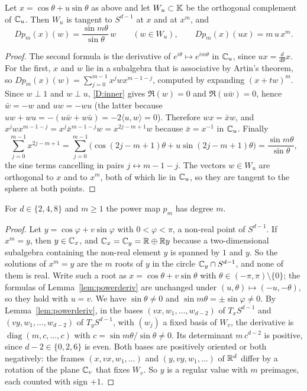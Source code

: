 \begin{lemma}\label{lem:powerderiv}
Let $x=\cos\theta+u\sin\theta$ as above and let $W_u\subset\mathbb{K}$ be the orthogonal complement of $\mathbb{C}_u$. Then $W_u$ is tangent to $S^{d-1}$ at $x$ and at $x^m$, and
\[
Dp_m(x)(w)=\frac{\sin m\theta}{\sin\theta}\,w\qquad(w\in W_u),\qquad Dp_m(x)(ux)=m\,u\,x^m .
\]
\end{lemma}

\begin{proof}
The second formula is the derivative of $e^{i\theta}\mapsto e^{im\theta}$ in $\mathbb{C}_u$, since $ux=\frac{d}{d\theta}x$. For the first, $x$ and $w$ lie in a subalgebra that is associative by Artin's theorem, so $Dp_m(x)(w)=\sum_{j=0}^{m-1}x^jwx^{m-1-j}$, computed by expanding $(x+tw)^m$. Since $w\perp1$ and $w\perp u$, \ref{D:inner} gives $\Re(w)=0$ and $\Re(u\bar w)=0$, hence $\bar w=-w$ and $uw=-wu$ (the latter because $uw+wu=-(u\bar w+w\bar u)=-2\langle u,w\rangle=0$). Therefore $wx=\bar xw$, and $x^jwx^{m-1-j}=x^j\bar x^{m-1-j}w=x^{2j-m+1}w$ because $\bar x=x^{-1}$ in $\mathbb{C}_u$. Finally
\[
\sum_{j=0}^{m-1}x^{2j-m+1}=\sum_{j=0}^{m-1}\bigl(\cos(2j-m+1)\theta+u\sin(2j-m+1)\theta\bigr)=\frac{\sin m\theta}{\sin\theta},
\]
the sine terms cancelling in pairs $j\leftrightarrow m-1-j$. The vectors $w\in W_u$ are orthogonal to $x$ and to $x^m$, both of which lie in $\mathbb{C}_u$, so they are tangent to the sphere at both points.
\end{proof}

\begin{proposition}\label{prop:powerdegree}
For $d\in\{2,4,8\}$ and $m\ge1$ the power map $p_m$ has degree $m$.
\end{proposition}

\begin{proof}
Let $y=\cos\varphi+v\sin\varphi$ with $0<\varphi<\pi$, a non-real point of $S^{d-1}$. If $x^m=y$, then $y\in\mathbb{C}_x$, and $\mathbb{C}_x=\mathbb{C}_y=\mathbb{R}\oplus\mathbb{R} y$ because a two-dimensional subalgebra containing the non-real element $y$ is spanned by $1$ and $y$. So the solutions of $x^m=y$ are the $m$ roots of $y$ in the circle $\mathbb{C}_y\cap S^{d-1}$, and none of them is real. Write such a root as $x=\cos\theta+v\sin\theta$ with $\theta\in(-\pi,\pi)\setminus\{0\}$; the formulas of Lemma~\ref{lem:powerderiv} are unchanged under $(u,\theta)\mapsto(-u,-\theta)$, so they hold with $u=v$. We have $\sin\theta\ne0$ and $\sin m\theta=\pm\sin\varphi\ne0$. By Lemma~\ref{lem:powerderiv}, in the bases $(vx,w_1,\dots,w_{d-2})$ of $T_xS^{d-1}$ and $(vy,w_1,\dots,w_{d-2})$ of $T_yS^{d-1}$, with $(w_j)$ a fixed basis of $W_v$, the derivative is $\operatorname{diag}(m,c,\dots,c)$ with $c=\sin m\theta/\sin\theta\ne0$. Its determinant $m\,c^{d-2}$ is positive, since $d-2\in\{0,2,6\}$ is even. Both bases are positively oriented or both negatively: the frames $(x,vx,w_1,\dots)$ and $(y,vy,w_1,\dots)$ of $\mathbb{R}^d$ differ by a rotation of the plane $\mathbb{C}_v$ that fixes $W_v$. So $y$ is a regular value with $m$ preimages, each counted with sign $+1$.
\end{proof}

